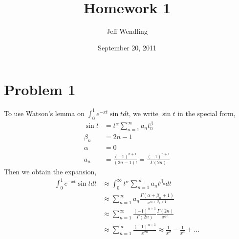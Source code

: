 \documentclass[12pt]{article}
\title{Homework 1}
\author{Jeff Wendling}
\date{September 20, 2011}
\newcommand{\eq}[1]{\begin{align*}#1\end{align*}}
\begin{document}
\maketitle
\section*{Problem 1}
To use Watson's lemma on $\int_0^1 e^{-xt}\sin t dt$, we write $\sin t$ in the special form,
\eq{
	\sin t &= t^\alpha \sum_{n=1}^\infty a_n t^\beta_n\\
	\beta_n &= 2n-1\\
	\alpha &= 0\\
	a_n &= \frac{(-1)^{n+1}}{(2n-1)!} = \frac{(-1)^{n+1}}{\Gamma(2n)}
}
Then we obtain the expansion,
\eq{
	\int_0^1 e^{-xt}\sin t dt &\approx \int_0^\infty t^\alpha\sum_{n=1}^\infty a_n t^{\beta_n}dt\\
	&\approx \sum_{n=1}^\infty a_n \frac{\Gamma(\alpha+\beta_n+1)}{x^{\alpha+\beta_n+1}}\\
	&\approx \sum_{n=1}^\infty \frac{(-1)^{n+1}}{\Gamma(2n)} \frac{\Gamma(2n)}{x^{2n}}\\
	&\approx \sum_{n=1}^\infty \frac{(-1)^{n+1}}{x^{2n}} \approx \frac{1}{x^2} - \frac{1}{x^4} + ...
}
\end{document}
